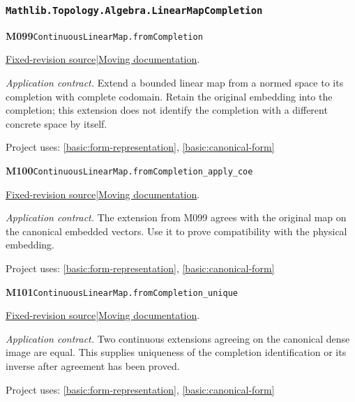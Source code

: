\documentclass[11pt,a4paper]{article}
\theoremstyle{definition}
\theoremstyle{remark}
\begin{document}
\subsubsection*{\nolinkurl{Mathlib.Topology.Algebra.LinearMapCompletion}}
\noindent\textbf{M099}\label{base:M099}\quad\nolinkurl{ContinuousLinearMap.fromCompletion}

\href{https://github.com/leanprover-community/mathlib4/blob/9bac2d0692944a775113f7c130fd5e5b4608a854/Mathlib/Topology/Algebra/LinearMapCompletion.lean}{Fixed-revision source}\quad|\quad\href{https://leanprover-community.github.io/mathlib4_docs/Mathlib/Topology/Algebra/LinearMapCompletion.html#ContinuousLinearMap.fromCompletion}{Moving documentation}.\par
\noindent\textit{Application contract.} Extend a bounded linear map from a normed space to its completion with complete codomain. Retain the original embedding into the completion; this extension does not identify the completion with a different concrete space by itself.\par
{\small Project uses: \ref{basic:form-representation}, \ref{basic:canonical-form}}\par\medskip

\noindent\textbf{M100}\label{base:M100}\quad\nolinkurl{ContinuousLinearMap.fromCompletion_apply_coe}

\href{https://github.com/leanprover-community/mathlib4/blob/9bac2d0692944a775113f7c130fd5e5b4608a854/Mathlib/Topology/Algebra/LinearMapCompletion.lean}{Fixed-revision source}\quad|\quad\href{https://leanprover-community.github.io/mathlib4_docs/Mathlib/Topology/Algebra/LinearMapCompletion.html#ContinuousLinearMap.fromCompletion_apply_coe}{Moving documentation}.\par
\noindent\textit{Application contract.} The extension from M099 agrees with the original map on the canonical embedded vectors. Use it to prove compatibility with the physical embedding.\par
{\small Project uses: \ref{basic:form-representation}, \ref{basic:canonical-form}}\par\medskip

\noindent\textbf{M101}\label{base:M101}\quad\nolinkurl{ContinuousLinearMap.fromCompletion_unique}

\href{https://github.com/leanprover-community/mathlib4/blob/9bac2d0692944a775113f7c130fd5e5b4608a854/Mathlib/Topology/Algebra/LinearMapCompletion.lean}{Fixed-revision source}\quad|\quad\href{https://leanprover-community.github.io/mathlib4_docs/Mathlib/Topology/Algebra/LinearMapCompletion.html#ContinuousLinearMap.fromCompletion_unique}{Moving documentation}.\par
\noindent\textit{Application contract.} Two continuous extensions agreeing on the canonical dense image are equal. This supplies uniqueness of the completion identification or its inverse after agreement has been proved.\par
{\small Project uses: \ref{basic:form-representation}, \ref{basic:canonical-form}}\par\medskip
\end{document}
